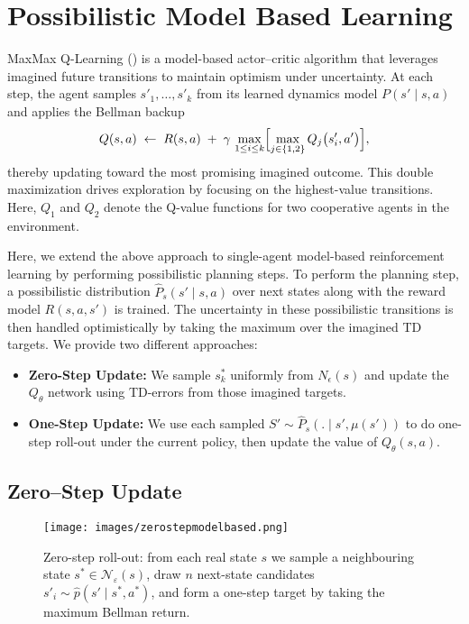 \documentclass[11pt,a4paper]{report}
\begin{document}
\chapter{Possibilistic Model Based Learning}
\label{chapter:pqml}

MaxMax Q-Learning (\cite{zhu2024maxmax}) is a model-based actor–critic algorithm that leverages imagined future transitions to maintain optimism under uncertainty. At each step, the agent samples \(s'_1,\dots,s'_k\) from its learned dynamics model \(P(s'\mid s,a)\) and applies the Bellman backup
\[
  Q(s,a)\;\leftarrow\;R(s,a)\;+\;\gamma\,\max_{1\le i\le k}\Bigl[\max_{j\in\{1,2\}}Q_j\bigl(s'_i,a'\bigr)\Bigr],
\]
thereby updating toward the most promising imagined outcome. This double maximization drives exploration by focusing on the highest-value transitions. Here, \(Q_1\) and \(Q_2\) denote the Q-value functions for two cooperative agents in the environment.

Here, we extend the above approach to single-agent model-based reinforcement learning by performing possibilistic planning steps. To perform the planning step, a possibilistic distribution \(\hat{P}_s(s'\mid s,a)\) over next states along with the reward model $R(s, a, s')$ is trained. The uncertainty in these possibilistic transitions is then handled optimistically by taking the maximum over the imagined TD targets. We provide two different approaches:

\begin{itemize}
  \item \textbf{Zero-Step Update:} We sample \(s^*_k\) uniformly from \(N_\epsilon(s)\) and update the \(Q_\theta\) network using TD-errors from those imagined targets.
  \item \textbf{One-Step Update:} We use each sampled \(S' \sim \hat{P}_s( . \mid s',\mu(s'))\) to do one-step roll-out under the current policy, then update the value of \(Q_\theta(s,a)\).
\end{itemize}
\section{Zero–Step Update}
\label{sec:zero_step_mbu}

\begin{figure}[htbp]
  \centering
  \texttt{[image: images/zerostepmodelbased.png]}
\caption{Zero-step roll-out: from each real state \(s\) we sample a neighbouring state \(s^{*} \in \mathcal{N}_\varepsilon(s)\), draw \(n\) next-state candidates \(s'_i \sim \hat{p}(s' \mid s^{*}, a^{*})\), and form a one-step target by taking the maximum Bellman return.}
\label{fig:zero_step_diag}
\end{figure}
\end{document}
